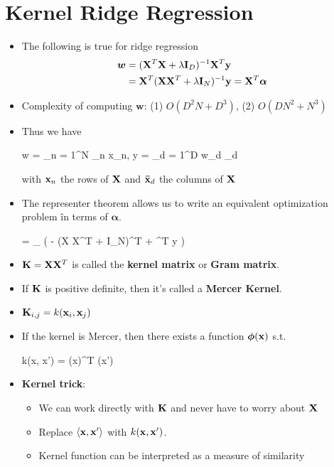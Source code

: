 \section{Kernel Ridge Regression}
\begin{itemize}
	\item The following is true for ridge regression
	\begin{align}
	    \bm w &= (\mathbf{X}^T \mathbf{X} + \lambda \mathbf{I}_D)^{-1} \mathbf{X}^T \mathbf{y} \\
	    &= \mathbf{X}^T(\mathbf{X}\mathbf{X}^T + \lambda \mathbf{I}_N)^{-1} \mathbf{y} = \mathbf{X}^T \bm \alpha \nonumber
	\end{align}
	\item Complexity of computing $\bm w$: (1) $O(D^2 N + D^3)$, (2) $O(D N^2 + N^3)$
	\item Thus we have
	\begin{myalign*}
	    \bm w = \sum_{n = 1}^N \alpha_n \*x_n, \hspace{5pt} \*y = \sum_{d = 1}^D w_d _d
	\end{myalign*}
	with $\mathbf{x}_n$ the rows of $\mathbf{X}$ and $\mathbf{\bar{x}}_d$ the columns of $\mathbf{X}$ 
	\item The representer theorem allows us to write an equivalent optimization problem în terms of $\bm \alpha$.
	\begin{myalign*}
	    \bm \alpha = \argmax_{\bm \alpha} 
	    \left(
	    - \bm \alpha (\*X \*X^T + \lambda \*I_N)^T \bm \alpha + \bm \alpha^T \*y 
	    \right)
	\end{myalign*}
	\item $\mathbf{K} = \mathbf{X} \mathbf{X}^T$ is called the \textbf{kernel matrix} or \textbf{Gram matrix}.
	\item If $\mathbf{K}$ is positive definite, then it's called a \textbf{Mercer Kernel}.
	\item $\mathbf{K}_{i,j} = k(\mathbf{x}_i, \mathbf{x}_j)$
	\item If the kernel is Mercer, then there exists a function $\bm \phi(\mathbf{x})$ s.t.
	\begin{myalign*}
	    k(\*x, \*x') = \bm \phi(\*x)^T \bm \phi(\*x')
	\end{myalign*}
	\item \textbf{Kernel trick}: 
	\begin{itemize}
		\item We can work directly with $\mathbf{K}$ and never have to worry about $\mathbf{X}$
		\item Replace $\langle \mathbf{x}, \mathbf{x}' \rangle$ with $k(\mathbf{x}, \mathbf{x}')$.
		\item Kernel function can be interpreted as a measure of similarity

\end{itemize}
\end{itemize}
